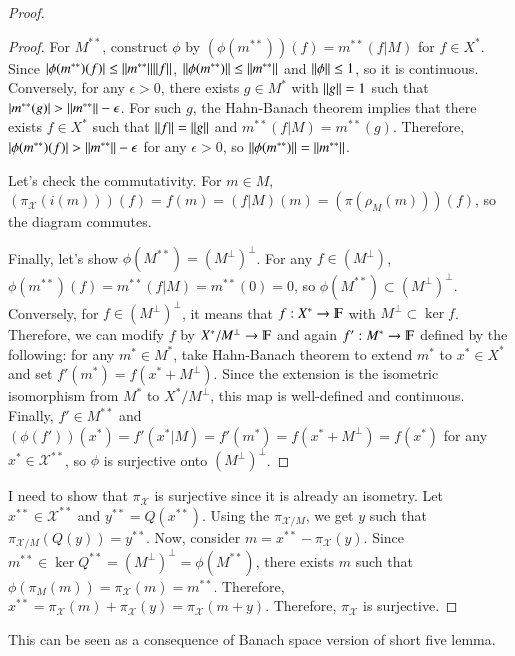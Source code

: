 \documentclass[a4paper, 12pt]{article}
\theoremstyle{Mydefinition}
\theoremstyle{Mytheorem}
\begin{document}
\begin{proof}
\begin{proof}
For $M^{**}$, construct $\phi$ by $(\phi(m^{**}))(f) = m^{**}(f|M)$ for $f\in X^*$. Since $\abs{\phi(m^{**})(f)}\leq \norm{m^{**}}\norm{f}$, $\norm{\phi(m^{**})}\leq \norm{m^{**}}$ and $\norm{\phi}\leq 1$, so it is continuous. Conversely, for any $\epsilon>0$, there exists $g\in M^*$ with $\norm{g} = 1$ such that $\abs{m^{**}(g)}>\norm{m^{**}}-\epsilon$. For such $g$, the Hahn-Banach theorem implies that there exists $f\in X^*$ such that $\norm{f}=\norm{g}$ and $m^{**}(f|M)=m^{**}(g)$. Therefore, $\abs{\phi(m^{**})(f)} >\norm{m^{**}}-\epsilon$ for any $\epsilon>0$, so $\norm{\phi(m^{**})}=\norm{m^{**}}$.

Let's check the commutativity. For $m\in M$, $(\pi_\mathscr{X}(i(m)))(f) = f(m) = (f|M)(m) = (\pi(\rho_M(m)))(f)$, so the diagram commutes.

Finally, let's show $\phi(M^{**})=(M^\perp)^\perp$. For any $f\in (M^\perp)$, $\phi(m^{**})(f) = m^{**}(f|M) = m^{**}(0) = 0$, so $\phi(M^{**})\subset (M^\perp)^\perp$. Conversely, for $f\in (M^\perp)^\perp$, it means that $f:X^*\rightarrow \varmathbb{F}$ with $M^\perp\subset \ker f$. Therefore, we can modify $f$ by $X^*/M^\perp\rightarrow \varmathbb{F}$ and again $f':M^*\rightarrow \varmathbb{F}$ defined by the following: for any $m^*\in M^*$, take Hahn-Banach theorem to extend $m^*$ to $x^*\in X^*$ and set $f'(m^*) = f(x^*+M^\perp)$. Since the extension is the isometric isomorphism from $M^*$ to $X^*/M^\perp$, this map is well-defined and continuous. Finally, $f'\in M^{**}$ and $(\phi(f'))(x^*) = f'(x^*|M) = f'(m^*) = f(x^*+M^\perp) = f(x^*)$ for any $x^*\in \mathscr{X}^{**}$, so $\phi$ is surjective onto $(M^\perp)^\perp$.
\end{proof}

I need to show that $\pi_{\mathscr{X}}$ is surjective since it is already an isometry. Let $x^{**}\in \mathscr{X}^{**}$ and $y^{**} = Q(x^{**})$. Using the $\pi_{\mathscr{X}/M}$, we get $y$ such that $\pi_{\mathscr{X}/M}(Q(y)) = y^{**}$. Now, consider $m = x^{**}-\pi_{\mathscr{X}}(y)$. Since $m^{**}\in \ker Q^{**}=(M^\perp)^\perp = \phi(M^{**})$, there exists $m$ such that $\phi(\pi_M(m)) = \pi_\mathscr{X}(m) = m^{**}$. Therefore, $x^{**} = \pi_\mathscr{X}(m) + \pi_{\mathscr{X}}(y) = \pi_\mathscr{X}(m+y)$. Therefore, $\pi_\mathscr{X}$ is surjective.
\end{proof}

This can be seen as a consequence of Banach space version of short five lemma.
\end{document}
